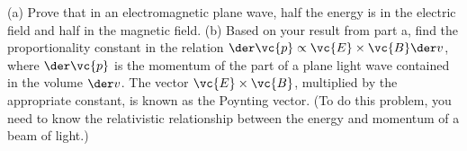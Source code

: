         (a) Prove that in an electromagnetic plane wave, half the energy
        is in the electric field and half in the magnetic field.\hwendpart
        (b) Based on your result from part a, find the proportionality
        constant in the relation $\der\vc{p}\propto\vc{E}\times\vc{B}\der v$,
        where $\der \vc{p}$ is the momentum of the part of a plane light wave contained in the
        volume $\der v$. The vector $\vc{E}\times\vc{B}$, multiplied by the appropriate
        constant, is known as the 
        Poynting vector. (To do this problem, you need to know the relativistic relationship between
        the energy and momentum of a beam of light.)\answercheck
